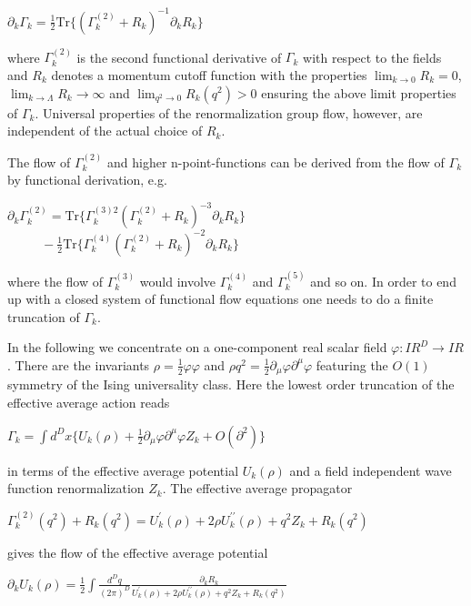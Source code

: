 \documentclass[a4paper,aps,prl,twocolumn,groupedaddress]{revtex4}
\begin{document}
\bigskip $ \partial_k \Gamma_k = \frac{1}{2} \textrm{Tr} \{ (\Gamma_k^{(2)} + R_k)^{-1} \partial_k R_k \} $

\bigskip
\noindent
where $\Gamma_k^{(2)}$ is the second functional derivative of $\Gamma_k$ with respect to the
fields and $R_k$ denotes a momentum cutoff function with the properties $\lim_{k\to 0}R_k=0$,
$\lim_{k\to \Lambda}R_k \to \infty$ and $\lim_{q^2\to 0}R_k(q^2) > 0$ ensuring the above limit
properties of $\Gamma_k$. Universal properties of the renormalization group flow, however, are
independent of the actual choice of $R_k$.

\bigskip
\noindent
The flow of $\Gamma_k^{(2)}$ and higher n-point-functions can be derived from the flow of
$\Gamma_k$ by functional derivation, e.g.

\bigskip $ \partial_k \Gamma_k^{(2)} = \textrm{Tr} \{ \Gamma_k^{(3)2} (\Gamma_k^{(2)} + R_k)^{-3} \partial_k R_k \} $ \\
$ ~~~~~~~~~~~~ - \frac{1}{2} \textrm{Tr} \{ \Gamma_k^{(4)} (\Gamma_k^{(2)} + R_k)^{-2} \partial_k R_k \} $

\bigskip
\noindent
where the flow of $\Gamma_k^{(3)}$ would involve $\Gamma_k^{(4)}$ and $\Gamma_k^{(5)}$ and so on.
In order to end up with a closed system of functional flow equations one needs to do a finite
truncation of $\Gamma_k$.

\bigskip
\noindent
In the following we concentrate on a one-component real scalar field $\varphi: I\!\!R^D \to
I\!\!R$. There are the invariants $\rho=\frac{1}{2}\varphi\varphi$ and
$\rho q^2=\frac{1}{2}\partial_\mu\varphi\partial^\mu\varphi$ featuring the $O(1)$ symmetry of
the Ising universality class. Here the lowest order truncation of the effective average action
reads

\bigskip $ \Gamma_k = \int d^Dx \{ U_k(\rho) + \frac{1}{2}\partial_\mu\varphi\partial^\mu\varphi Z_k + O(\partial^2) \} $

\bigskip
\noindent
in terms of the effective average potential $ U_k(\rho) $ and a field independent
wave function renormalization $ Z_k $. The effective average propagator

\bigskip $ \Gamma_k^{(2)}(q^2) + R_k(q^2) = U_k^\prime(\rho) + 2 \rho U_k^{\prime\prime}(\rho) + q^2 Z_k + R_k(q^2) $

\bigskip
\noindent
gives the flow of the effective average potential

\bigskip $ \partial_k U_k(\rho) = \frac{1}{2} \int \frac{d^Dq}{(2\pi)^D} \frac{\partial_k R_k}{U_k^\prime(\rho) + 2 \rho U_k^{\prime\prime}(\rho) + q^2 Z_k + R_k(q^2)} $
\end{document}
